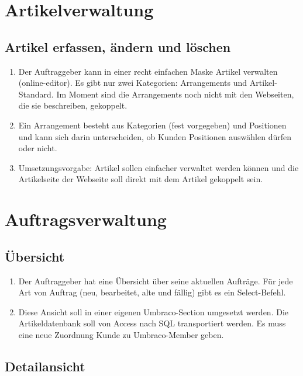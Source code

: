 \section{Artikelverwaltung}

\subsection{Artikel erfassen, ändern und löschen}

\begin{enumerate}
	\item Der Auftraggeber kann in einer recht einfachen Maske Artikel verwalten (online-editor). Es gibt nur zwei Kategorien: Arrangements und Artikel-Standard. Im Moment sind die Arrangements noch nicht mit den Webseiten, die sie beschreiben, gekoppelt.
	\item Ein Arrangement besteht aus Kategorien (fest vorgegeben) und Positionen und kann sich darin unterscheiden, ob Kunden Positionen auswählen dürfen oder nicht.
	\item Umsetzungsvorgabe: Artikel sollen einfacher verwaltet werden können und die Artikelseite der Webseite soll direkt mit dem Artikel gekoppelt sein.
\end{enumerate} 


\section{Auftragsverwaltung}

\subsection{Übersicht}

\begin{enumerate}
	\item Der Auftraggeber hat eine Übersicht über seine aktuellen Aufträge. Für jede Art von Auftrag (neu, bearbeitet, alte und fällig) gibt es ein Select-Befehl.
	\item Diese Ansicht soll in einer eigenen Umbraco-Section umgesetzt werden. Die Artikeldatenbank soll von Access nach SQL transportiert werden. Es muss eine neue Zuordnung Kunde zu Umbraco-Member geben.
\end{enumerate} 



\subsection{Detailansicht}

